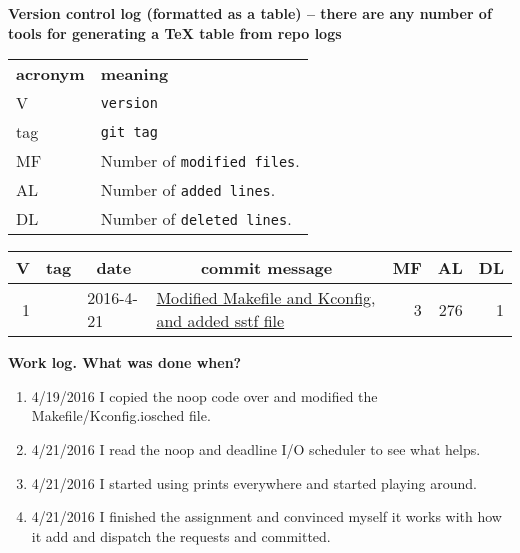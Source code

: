 \documentclass[draftclsnofoot,onecolumn,letterpaper,10pt,titlepage]{IEEEtran}
\begin{document}
\textbf{Version control log (formatted as a table) -- there are any number of tools for generating a TeX table from repo logs}
\begin{tabular}{lp{12cm}}
  \label{tabular:legend:git-log}
  \textbf{acronym} & \textbf{meaning} \\
  V & \texttt{version} \\
  tag & \texttt{git tag} \\
  MF & Number of \texttt{modified files}. \\
  AL & Number of \texttt{added lines}. \\
  DL & Number of \texttt{deleted lines}. \\
\end{tabular}

\bigskip

\noindent
\begin{tabular}{|rllp{7.5cm}rrr|}
\hline \multicolumn{1}{|c}{\textbf{V}} & \multicolumn{1}{c}{\textbf{tag}}
& \multicolumn{1}{c}{\textbf{date}}
& \multicolumn{1}{c}{\textbf{commit message}} & \multicolumn{1}{c}{\textbf{MF}}
& \multicolumn{1}{c}{\textbf{AL}} & \multicolumn{1}{c|}{\textbf{DL}} \\ \hline

\hline 1 &  & 2016-4-21 & \href{https://github.com/umagatl/cs444-135/commit/d418a113fac994b66fdfe3516751fce022da6d1d}{Modified Makefile and Kconfig, and added sstf file} & 3 & 276 & 1 \\
\hline
\end{tabular}

\textbf{Work log. What was done when?}
\begin{enumerate}
\item 4/19/2016 I copied the noop code over and modified the Makefile/Kconfig.iosched file.
\item 4/21/2016 I read the noop and deadline I/O scheduler to see what helps.
\item 4/21/2016 I started using prints everywhere and started playing around.
\item 4/21/2016 I finished the assignment and convinced myself it works with how it add and dispatch the requests and committed.
\end{enumerate}
\end{document}
